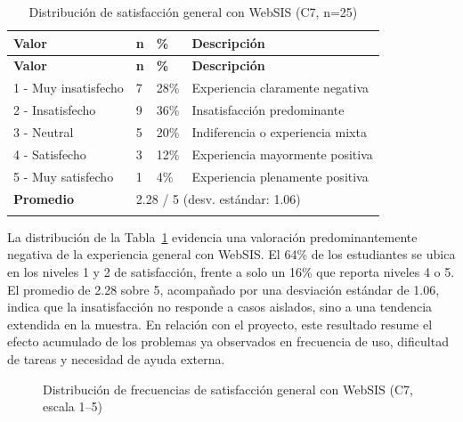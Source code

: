 \begin{longtable}{|p{4cm}|p{2.5cm}|p{2.5cm}|p{4.5cm}|}
\hline
\textbf{Valor} & \textbf{n} & \textbf{\%} & \textbf{Descripción} \\
\hline
\endfirsthead
\hline
\textbf{Valor} & \textbf{n} & \textbf{\%} & \textbf{Descripción} \\
\hline
\endhead
\hline
\endfoot
\endlastfoot
 
1 - Muy insatisfecho & 7  & 28\% & Experiencia claramente negativa \\
2 - Insatisfecho     & 9  & 36\% & Insatisfacción predominante      \\
3 - Neutral          & 5  & 20\% & Indiferencia o experiencia mixta \\
4 - Satisfecho       & 3  & 12\% & Experiencia mayormente positiva  \\
5 - Muy satisfecho   & 1  & 4\%  & Experiencia plenamente positiva  \\
\hline
\textbf{Promedio}     & \multicolumn{3}{l|}{2.28 / 5 \quad (desv. estándar: 1.06)} \\
\hline
\caption{Distribución de satisfacción general con WebSIS (C7, n=25)}\label{tab:satisfaccion}
\end{longtable}

La distribución de la Tabla~\ref{tab:satisfaccion} evidencia una valoración predominantemente negativa de la experiencia general con WebSIS. El 64\% de los estudiantes se ubica en los niveles 1 y 2 de satisfacción, frente a solo un 16\% que reporta niveles 4 o 5. El promedio de 2.28 sobre 5, acompañado por una desviación estándar de 1.06, indica que la insatisfacción no responde a casos aislados, sino a una tendencia extendida en la muestra. En relación con el proyecto, este resultado resume el efecto acumulado de los problemas ya observados en frecuencia de uso, dificultad de tareas y necesidad de ayuda externa.
 
\begin{figure}[h!]
\centering
{}
\caption{Distribución de frecuencias de satisfacción general con WebSIS (C7, escala 1--5)}
\label{fig:satisfaccion}
\end{figure}

